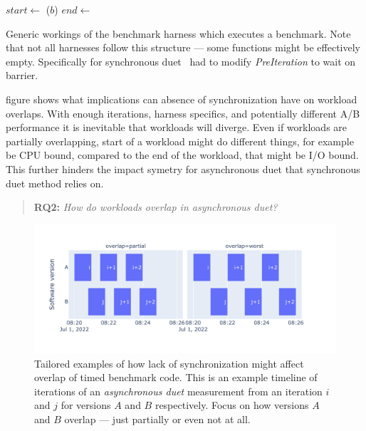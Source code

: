 \begin{algorithm}
\begin{algorithmic}
		\State {}
		 	\State {}
			\State $start \gets$ 
			\State {}($b$)
			\State $end \gets$ 
			\State {}
		\EndFor
		\State {}
		\State {}
	\EndFunction
\end{algorithmic}
\caption{
	Generic workings of the benchmark harness which executes a benchmark.
	Note that not all harnesses follow this structure --- some functions might be effectively empty.
	Specifically for synchronous duet~\citet{bulej2020duet} had to modify \emph{PreIteration} to wait on barrier.
}
\label{alg:harness}
\end{algorithm}

 figure shows what implications can absence of synchronization have on workload overlaps.
With enough iterations, harness specifics, and potentially different A/B performance it is inevitable that workloads will diverge.
Even if workloads are partially overlapping, start of a workload might do different things, for example be CPU bound, compared to the end of the workload, that might be I/O bound.
This further hinders the impact symetry for asynchronous duet that synchronous duet method relies on.

\begin{quote}
	\textbf{RQ2:} \emph{How do workloads overlap in asynchronous duet?}
\end{quote}

\begin{figure}
	\centering
	\includegraphics[width=.9\linewidth]{./figures/overlap_timeline.pdf}
	\caption{
		Tailored examples of how lack of synchronization might affect overlap of timed benchmark code.
		This is an example timeline of iterations of an \emph{asynchronous duet} measurement from an iteration $i$ and $j$ for versions $A$ and $B$ respectively.
		Focus on how versions $A$ and $B$ overlap --- just partially or even not at all.
	}
	\label{fig:overlap_timeline}
\end{figure}

